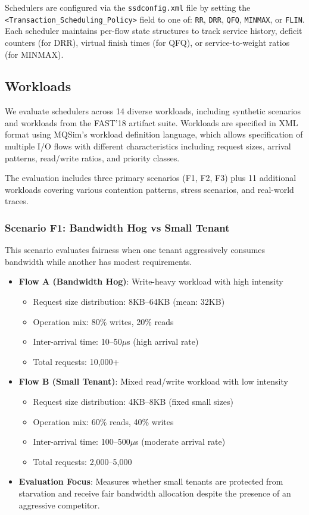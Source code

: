 \documentclass[11pt]{article}
\begin{document}
Schedulers are configured via the \texttt{ssdconfig.xml} file by setting the \texttt{<Transaction\_Scheduling\_Policy>} field to one of: \texttt{RR}, \texttt{DRR}, \texttt{QFQ}, \texttt{MINMAX}, or \texttt{FLIN}. Each scheduler maintains per-flow state structures to track service history, deficit counters (for DRR), virtual finish times (for QFQ), or service-to-weight ratios (for MINMAX).

\subsection{Workloads}

We evaluate schedulers across 14 diverse workloads, including synthetic scenarios and workloads from the FAST'18 artifact suite. Workloads are specified in XML format using MQSim's workload definition language, which allows specification of multiple I/O flows with different characteristics including request sizes, arrival patterns, read/write ratios, and priority classes.

The evaluation includes three primary scenarios (F1, F2, F3) plus 11 additional workloads covering various contention patterns, stress scenarios, and real-world traces.

\subsubsection{Scenario F1: Bandwidth Hog vs Small Tenant}

This scenario evaluates fairness when one tenant aggressively consumes bandwidth while another has modest requirements.

\begin{itemize}
    \item \textbf{Flow A (Bandwidth Hog)}: Write-heavy workload with high intensity
    \begin{itemize}
        \item Request size distribution: 8KB--64KB (mean: 32KB)
        \item Operation mix: 80\% writes, 20\% reads
        \item Inter-arrival time: 10--50$\mu$s (high arrival rate)
        \item Total requests: 10,000+
    \end{itemize}
    \item \textbf{Flow B (Small Tenant)}: Mixed read/write workload with low intensity
    \begin{itemize}
        \item Request size distribution: 4KB--8KB (fixed small sizes)
        \item Operation mix: 60\% reads, 40\% writes
        \item Inter-arrival time: 100--500$\mu$s (moderate arrival rate)
        \item Total requests: 2,000--5,000
    \end{itemize}
    \item \textbf{Evaluation Focus}: Measures whether small tenants are protected from starvation and receive fair bandwidth allocation despite the presence of an aggressive competitor.
\end{itemize}
\end{document}
